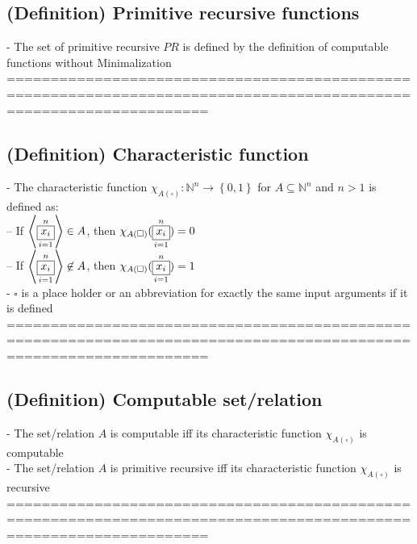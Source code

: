 \documentclass{book}
\newcommand{\inot}{\not}
\newcommand{\placeholder}{\square}
\newcommand{\set}[1]{\left\{ #1 \right\}}
\newcommand{\seq}[1]{\left\langle #1 \right\rangle}
\newcommand{\vdc}[3]{\underset{#2}{\overset{#3}{\fbox{$#1$}}}}
\begin{document}
\subsection{(Definition) Primitive recursive functions} %
	- The set of primitive recursive $PR$ is defined by the definition of computable functions without Minimalization \\
	===================================================================================================================
\subsection{(Definition) Characteristic function} %
	- The characteristic function $\chi_{A(\placeholder)}: \mathbb{N}^n \rightarrow \set{0, 1}$ for $A \subseteq \mathbb{N}^n$ and $n>1$ is defined as: \\
		-- If $\seq{\vdc{x_i}{i=1}{n}} \in A$, then $\chi_{A(\placeholder)}(\vdc{x_i}{i=1}{n}) = 0$ \\
		-- If $\seq{\vdc{x_i}{i=1}{n}} \inot \in A$, then $\chi_{A(\placeholder)}(\vdc{x_i}{i=1}{n}) = 1$ \\
	- $\placeholder$ is a place holder or an abbreviation for exactly the same input arguments if it is defined \\
	===================================================================================================================
\subsection{(Definition) Computable set/relation} %
	- The set/relation $A$ is computable iff its characteristic function $\chi_{A(\placeholder)}$ is computable \\
	- The set/relation $A$ is primitive recursive iff its characteristic function $\chi_{A(\placeholder)}$ is recursive \\
	===================================================================================================================
\end{document}
